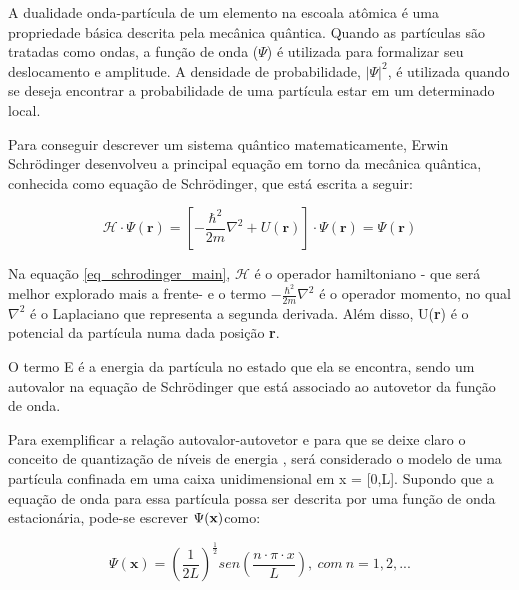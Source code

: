\par A dualidade onda-partícula de um elemento na escoala atômica é uma propriedade básica descrita pela mecânica quântica\cite{qm_fis3}. Quando as partículas são tratadas como ondas, a função de onda ($\Psi$) é utilizada para formalizar seu deslocamento e amplitude\cite{qm_fis4}. A densidade de probabilidade, $\left| \Psi \right|^2$, é utilizada quando se deseja encontrar a probabilidade de uma partícula estar em um determinado local.

    \par Para conseguir descrever um sistema quântico matematicamente, Erwin Schrödinger desenvolveu a principal equação em torno da mecânica quântica, conhecida como equação de Schrödinger, que está escrita a seguir:

    \begin{equation}\label{eq_schrodinger_main}
      \mathcal{H} \cdot \Psi(\mathbf{r}) = \left[ -\frac{\hbar^2}{2m}\nabla^2 + U(\textbf{r}) \right] \cdot \Psi(\mathbf{r}) = \Psi(\mathbf{r})
    \end{equation}

    \par Na equação \eqref{eq_schrodinger_main}, $\mathcal{H}$ é o operador hamiltoniano - que será melhor explorado mais a frente- e o termo $ -\frac{\hbar^2}{2m}\nabla^2 $ é o operador momento, no qual $\nabla^2$ é o Laplaciano que representa a segunda derivada. Além disso, U(\textbf{r}) é o potencial da partícula numa dada posição \textbf{r}.

    \par O termo E é a energia da partícula no estado que ela se encontra, sendo um autovalor na equação de Schrödinger que está associado ao autovetor da função de onda.

    \par Para exemplificar a relação autovalor-autovetor e para que se deixe claro o conceito de quantização de níveis de energia , será considerado o modelo de uma partícula confinada em uma caixa unidimensional em x = [0,L]. Supondo que a equação de onda para essa partícula possa ser descrita por uma função de onda estacionária, pode-se escrever $\Psi (\textbf x)$como:

    \begin{equation}\label{eq_schrodinger_eq1}
      \Psi(\mathbf{x}) = \left(\frac{1}{2L}\right)^\frac{1}{2} sen\left(\frac{n \cdot \pi \cdot x}{L}\right),\ com\ n = 1, 2, ...
    \end{equation}

